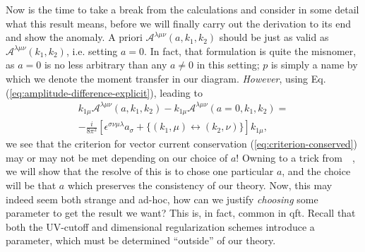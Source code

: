 Now is the time to take a break from the calculations and consider in some detail what this result means, before we will finally carry out the derivation to its end and show the anomaly.
A priori $\mathcal{A}^{\lambda \mu \nu }(a, k_1, k_2)$ should be just as valid as $\mathcal{A}^{\lambda \mu \nu }(k_1,  k_2)$, i.e. setting $a=0$.
In fact, that formulation is quite the misnomer, as $a=0$ is no less arbitrary than any $a\neq 0$ in this setting;
$p$ is simply a name by which we denote the moment transfer in our diagram.
\emph{However}, using Eq. (\ref{eq:amplitude-difference-explicit}), leading to
\begin{multline}
  \label{eq:19}
  k_{1\mu } \mathcal{A}^{\lambda \mu \nu }(a, k_1, k_2) - k_{1\mu }\mathcal{A}^{\lambda \mu \nu }(a=0, k_1, k_2) =\\
  -\frac{i}{8\pi^2} \left[
  \epsilon ^{\sigma \nu \mu \lambda } a_{\sigma } +  \{(k_1,\mu ) \leftrightarrow (k_2, \nu )\} \right] k_{1\mu }, 
\end{multline}
we see that the criterion for vector current conservation (\ref{eq:criterion-conserved}) may or may not be met depending on our choice of $a$!
Owning to a trick from~\citeauthor{zeeQuantumFieldTheory2010}~\cite{zeeQuantumFieldTheory2010}, we will show that the resolve of this is to chose one particular $a$, and the choice will be that $a$ which preserves the consistency of our theory.
Now, this may indeed seem both strange and ad-hoc, how can we justify \emph{choosing} some parameter to get the result we want?
This is, in fact, common in \gls{qft}.
Recall that both the UV-cutoff and dimensional regularization schemes introduce a parameter, which must be determined ``outside'' of our theory.


